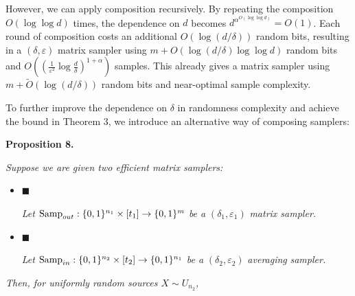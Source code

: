 However, we can apply composition recursively. By repeating the composition $O(\log\log d)$ times, the dependence on $d$ becomes $d^{\alpha^{O(\log\log d)}}=O(1)$. Each round of composition costs an additional $O(\log(d/\delta))$ random bits, resulting in a $(\delta,\varepsilon)$ matrix sampler using $m+O(\log(d/\delta)\log\log d)$ random bits and $O((\frac{1}{\varepsilon^{2}}\log\frac{d}{\delta})^{1+\alpha})$ samples. This already gives a matrix sampler using $m+\widetilde{O}(\log(d/\delta))$ random bits and near-optimal sample complexity.\par




To further improve the dependence on $\delta$ in randomness complexity and achieve the bound in Theorem 3, we introduce an alternative way of composing samplers:\par





\par\medskip\noindent\textbf{
\textbf{Proposition 8}\textbf{.}
}\par



\emph{Suppose we are given two efficient matrix samplers:}\par


\begin{itemize}


\item[] 
$\blacksquare$ 


\emph{Let }$\textup{{Samp}}_{out}:\{0,1\}^{n_{1}}\times[t_{1}]\to\{0,1\}^{m}$\emph{ be a }$(\delta_{1},\varepsilon_{1})$\emph{ matrix sampler.}\par





\item[] 
$\blacksquare$ 


\emph{Let }$\textup{{Samp}}_{in}:\{0,1\}^{n_{2}}\times[t_{2}]\to\{0,1\}^{n_{1}}$\emph{ be a }$(\delta_{2},\varepsilon_{2})$\emph{ }\emph{averaging}\emph{ sampler.}\par





\end{itemize}


\emph{Then, for uniformly random sources $X\sim U_{n_{2}}$,}\par


